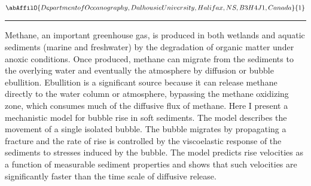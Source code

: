 \begin{minipage}{\linewidth}\begin{center}\begin{minipage}{\linewidth}
   \vspace{2 mm} \begin{center}
    \vspace{2 mm}\begin{center}
  
  $\abAffilO{Department of Oceanography, Dalhousie University, Halifax, NS, B3H 4J1, Canada}{1}$

  \end{center}
  \vspace{2 mm}
  \end{center}\end{minipage}\end{center}
  \begin{center}\rule{0.70\linewidth}{0.5 pt}\end{center}
  \begin{minipage}{\linewidth}
\noindent Methane, an important greenhouse gas, is produced in both wetlands and aquatic sediments (marine and freshwater) by the degradation of organic matter under anoxic conditions.  Once produced, methane can migrate from the sediments to the overlying water and eventually the atmosphere by diffusion or bubble ebullition.   Ebullition is a significant source because it can release methane directly to the water column or atmosphere, bypassing the methane oxidizing zone, which consumes much of the diffusive flux of methane.  Here I present a mechanistic model for bubble rise in soft sediments.   The model describes the movement of a single isolated bubble.  The bubble migrates by propagating a fracture and the rate of rise is controlled by the viscoelastic response of the sediments to stresses induced by the bubble.  The model predicts rise velocities as a function of measurable sediment properties and shows that such velocities are significantly faster than the time scale of diffusive release.
\end{minipage}\end{minipage}
